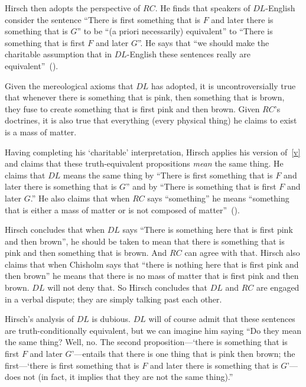 \documentclass[11pt]{article}
\begin{document}
\begin{spacing}{1.25}
Hirsch then adopts the perspective of $RC$.  He finds that speakers of
$DL$-English consider the sentence ``There is first something that is
$F$ and later there is something that is $G$'' to be ``(a priori
necessarily) equivalent'' to ``There is something that is first $F$
and later $G$''.  He says that ``we should make the charitable
assumption that in $DL$-English these sentences really are
equivalent''~(\citeyear[78]{hirsch2005}).

Given the mereological axioms that $DL$ has adopted, it is
uncontroversially true that whenever there is something that is pink,
then something that is brown, they fuse to create something that is
first pink and then brown.  Given $RC$'s doctrines, it is also
true that everything (every physical thing) he claims to exist is a
mass of matter.

Having completing his `charitable' interpretation, Hirsch applies his
version of~\ref{v} and claims that these truth-equivalent propositions
{\em mean} the same thing.  He claims that $DL$ means the same thing
by ``There is first something that is $F$ and later there is something
that is $G$'' and by ``There is something that is first $F$ and later
$G$.''  He also claims that when $RC$ says ``something'' he means
``something that is either a mass of matter or is not composed of
matter''~(\citeyear[76]{hirsch2005}).

Hirsch concludes that when $DL$ says ``There is something here that is
first pink and then brown'', he should be taken to mean that there is
something that is pink and then something that is brown.  And $RC$ can
agree with that.  Hirsch also claims that when Chisholm says that
``there is nothing here that is first pink and then brown'' he means
that there is no mass of matter that is first pink and then
brown.  $DL$ will not deny that.  So Hirsch concludes that $DL$ and
$RC$ are engaged in a verbal dispute; they are simply talking past
each other.

Hirsch's analysis of $DL$ is dubious.  $DL$ will of course admit that
these sentences are truth-conditionally equivalent, but we can imagine
him saying ``Do they mean the same thing?  Well, no.  The second
proposition---`there is something that is first $F$ and later
$G$'---entails that there is one thing that is pink then brown; the
first---`there is first something that is $F$ and later there is
something that is $G$'---does not (in fact, it implies that they are
not the same thing).''


\end{spacing}
\end{document}
